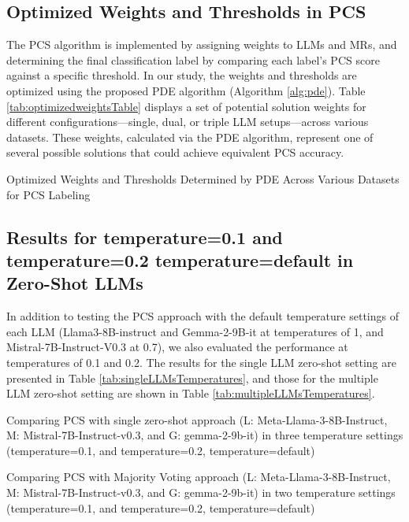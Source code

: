 \newpage
\subsection{Optimized Weights and Thresholds in PCS}
\label{optimizedweights}
The PCS algorithm is implemented by assigning weights to LLMs and MRs, and determining the final classification label by comparing each label's PCS score against a specific threshold. In our study, the weights and thresholds are optimized using the proposed PDE algorithm (Algorithm \ref{alg:pde}). Table \ref{tab:optimizedweightsTable} displays a set of potential solution weights for different configurations—single, dual, or triple LLM setups—across various datasets. These weights, calculated via the PDE algorithm, represent one of several possible solutions that could achieve equivalent PCS accuracy.


\begin{table}[h]
\caption{Optimized Weights and Thresholds Determined by PDE Across Various Datasets for PCS Labeling}
\label{tab:optimizedweightsTable}
\vskip 0.15in
{

}
\vskip -0.1in
\end{table}


\newpage
\subsection{Results for temperature=0.1 and temperature=0.2 temperature=default in Zero-Shot LLMs}
\label{sec:singleLLMsTemperatures}

In addition to testing the PCS approach with the default temperature settings of each LLM (Llama3-8B-instruct and Gemma-2-9B-it at temperatures of 1, and Mistral-7B-Instruct-V0.3 at 0.7), we also evaluated the performance at temperatures of 0.1 and 0.2. The results for the single LLM zero-shot setting are presented in Table \ref{tab:singleLLMsTemperatures}, and those for the multiple LLM zero-shot setting are shown in Table \ref{tab:multipleLLMsTemperatures}. 


\begin{table}[h]
\centering%
\caption{Comparing PCS with single zero-shot approach (L: Meta-Llama-3-8B-Instruct, M: Mistral-7B-Instruct-v0.3, and G: gemma-2-9b-it) in three temperature settings (temperature=0.1, and temperature=0.2, temperature=default)}
\label{tab:singleLLMsTemperatures}
\vskip 0.15in

{

}
\end{table}


\newpage

\begin{table}[htp!]
\centering%
\caption{Comparing PCS with Majority Voting approach (L: Meta-Llama-3-8B-Instruct, M: Mistral-7B-Instruct-v0.3, and G: gemma-2-9b-it) in two temperature settings (temperature=0.1, and temperature=0.2, temperature=default)}
\label{tab:multipleLLMsTemperatures}
\vskip 0.15in
{

}
\end{table}